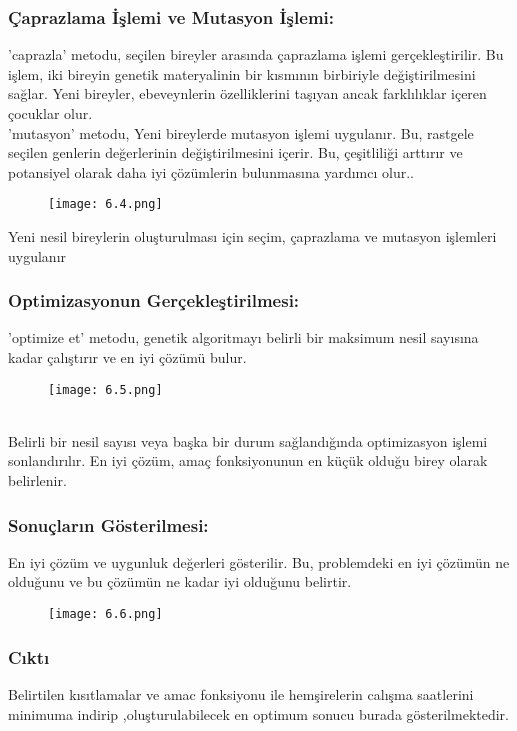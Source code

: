 \documentclass[12pt, a4paper]{article}
\begin{document}
\begin{flushleft}
\subsubsection{Çaprazlama İşlemi ve Mutasyon İşlemi: }'caprazla' metodu, seçilen bireyler arasında çaprazlama işlemi gerçekleştirilir. Bu işlem, iki bireyin genetik materyalinin bir kısmının birbiriyle değiştirilmesini sağlar. Yeni bireyler, ebeveynlerin özelliklerini taşıyan ancak farklılıklar içeren çocuklar olur.\\'mutasyon' metodu, Yeni bireylerde mutasyon işlemi uygulanır. Bu, rastgele seçilen genlerin değerlerinin değiştirilmesini içerir. Bu, çeşitliliği arttırır ve potansiyel olarak daha iyi çözümlerin bulunmasına yardımcı olur..
\begin{figure}[!h]
	\centering
	\texttt{[image: 6.4.png]}
	\\[20pt]
\end{figure}

Yeni nesil bireylerin oluşturulması için seçim, çaprazlama ve mutasyon işlemleri uygulanır
\newpage
\subsubsection{Optimizasyonun Gerçekleştirilmesi: }'optimize et' metodu, genetik algoritmayı belirli bir maksimum nesil sayısına kadar çalıştırır ve en iyi çözümü bulur.
\begin{figure}[!h]
	\centering
	\texttt{[image: 6.5.png]}
	\\[20pt]
\end{figure}\\
Belirli bir nesil sayısı veya başka bir durum sağlandığında optimizasyon işlemi sonlandırılır. En iyi çözüm, amaç fonksiyonunun en küçük olduğu birey olarak belirlenir.
\newpage
\subsubsection{Sonuçların Gösterilmesi:} En iyi çözüm ve uygunluk değerleri gösterilir. Bu, problemdeki en iyi çözümün ne olduğunu ve bu çözümün ne kadar iyi olduğunu belirtir.

\begin{figure}[!h]
	\centering
	\texttt{[image: 6.6.png]}
	\\[20pt]
\end{figure}
\subsubsection{Cıktı} Belirtilen kısıtlamalar  ve amac fonksiyonu ile  hemşirelerin calışma saatlerini minimuma indirip ,oluşturulabilecek en optimum sonucu burada gösterilmektedir. 


\end{flushleft}
\end{document}
